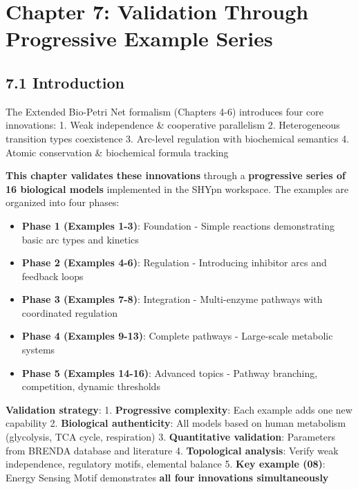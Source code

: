 \hypertarget{chapter-7-validation-through-progressive-example-series}{%
\chapter{Chapter 7: Validation Through Progressive Example
Series}\label{chapter-7-validation-through-progressive-example-series}}

\hypertarget{introduction}{%
\section{7.1 Introduction}\label{introduction}}

The Extended Bio-Petri Net formalism (Chapters 4-6) introduces four core
innovations: 1. Weak independence \& cooperative parallelism 2.
Heterogeneous transition types coexistence 3. Arc-level regulation with
biochemical semantics 4. Atomic conservation \& biochemical formula
tracking

\textbf{This chapter validates these innovations} through a
\textbf{progressive series of 16 biological models} implemented in the
SHYpn workspace. The examples are organized into four phases:

\begin{itemize}
\tightlist
\item
  \textbf{Phase 1 (Examples 1-3)}: Foundation - Simple reactions
  demonstrating basic arc types and kinetics
\item
  \textbf{Phase 2 (Examples 4-6)}: Regulation - Introducing inhibitor
  arcs and feedback loops
\item
  \textbf{Phase 3 (Examples 7-8)}: Integration - Multi-enzyme pathways
  with coordinated regulation
\item
  \textbf{Phase 4 (Examples 9-13)}: Complete pathways - Large-scale
  metabolic systems
\item
  \textbf{Phase 5 (Examples 14-16)}: Advanced topics - Pathway
  branching, competition, dynamic thresholds
\end{itemize}

\textbf{Validation strategy}: 1. \textbf{Progressive complexity}: Each
example adds one new capability 2. \textbf{Biological authenticity}: All
models based on human metabolism (glycolysis, TCA cycle, respiration) 3.
\textbf{Quantitative validation}: Parameters from BRENDA database and
literature 4. \textbf{Topological analysis}: Verify weak independence,
regulatory motifs, elemental balance 5. \textbf{Key example (08)}:
Energy Sensing Motif demonstrates \textbf{all four innovations
simultaneously}

